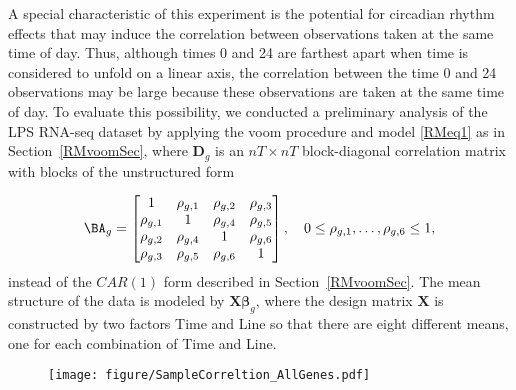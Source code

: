 A special characteristic of this experiment is the potential for circadian rhythm effects that may induce the correlation between observations taken at the same time of day. Thus, although times 0 and 24 are farthest apart when time is considered to unfold on a linear axis, the correlation between the time 0 and 24 observations may be large because these observations are taken at the same time of day.  To evaluate this possibility, we conducted a preliminary analysis of the LPS RNA-seq dataset by applying the voom procedure and model \eqref{RMeq1} as in Section~\ref{RMvoomSec}, where  $\boldsymbol{D}_g$ is an $nT \times nT$ block-diagonal correlation matrix with blocks of the unstructured form

\[
\BA_g =
\begin{bmatrix}
1 &  \rho_{g, 1}  & \rho_{g,2}  & \rho_{g,3}\\
\rho_{g, 1}   &  1 & \rho_{g, 4} & \rho_{g,5}\\
\rho_{g, 2}   & \rho_{g, 4} & 1 & \rho_{g,6}\\
\rho_{g,3} &\rho_{g,5} &   \rho_{g,6} & 1
\end{bmatrix},
\quad 0 \leq \rho_{g,1}, \dots, \rho_{g,6} \leq 1,
\]
instead of the $CAR(1)$ form described in Section~\ref{RMvoomSec}. The mean structure of the data is modeled by $\boldsymbol{X}\boldsymbol{\beta}_g $, where the design matrix $\boldsymbol{X}$ is constructed by two factors Time and Line so that there are eight different means, one for each combination of Time and Line.
\begin{figure}[!htbp]
\centering
\texttt{[image: figure/SampleCorreltion\_AllGenes.pdf]}
       \label{RMfigrho}
\end{figure}

